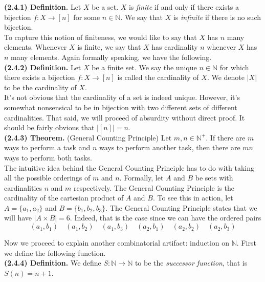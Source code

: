 \documentclass[12pt]{book}
\def\N{{\mathbb{N}}}
\def\header #1{\noindent\textbf{#1}}
\begin{document}
\header{(2.4.1) Definition.} Let $X$ be a set. $X$ is \textit{finite} if and only if there exists a bijection $f\colon X\rightarrow[n]$ for some $n\in\N$. We say that $X$ is \textit{infinite} if there is no such bijection.\\

To capture this notion of finiteness, we would like to say that $X$ has $n$ many elements. Whenever $X$ is finite, we say that $X$ has cardinality $n$ whenever $X$ has $n$ many elements. Again formally speaking, we have the following.\\

\header{(2.4.2) Definition.} Let $X$ be a finite set. We say the unique $n\in\N$ for which there exists a bijection $f\colon X\rightarrow[n]$ is called the cardinality of $X$. We denote $|X|$ to be the cardinality of $X$.\\

It's not obvious that the cardinality of a set is indeed unique. However, it's somewhat nonsensical to be in bijection with two different sets of different cardinalities. That said, we will proceed of absurdity without direct proof. It should be fairly obvious that $|[n]|=n$.\\

\header{(2.4.3) Theorem.} (General Counting Principle) Let $m,n\in\N^+$. If there are $m$ ways to perform a task and $n$ ways to perform another task, then there are $mn$ ways to perform both tasks.\\

The intuitive idea behind the General Counting Principle has to do with taking all the possible orderings of $m$ and $n$. Formally, let $A$ and $B$ be sets with cardinalities $n$ and $m$ respectively. The General Counting Principle is the cardinality of the cartesian product of $A$ and $B$. To see this in action, let $A=\{a_1,a_2\}$ and $B=\{b_1,b_2,b_3\}$. The General Counting Principle states that we will have $|A\times B|=6$. Indeed, that is the case since we can have the ordered pairs
\[(a_1,b_1)\quad (a_1,b_2)\quad (a_1,b_3)\quad (a_2,b_1)\quad (a_2,b_2)\quad (a_2,b_3)\]

Now we proceed to explain another combinatorial artifact: induction on $\N$. First we define the following function.\\

\header{(2.4.4) Definition.} We define $S\colon\N\rightarrow\N$ to be the \textit{successor function}, that is $S(n)=n+1$.\\
\end{document}
